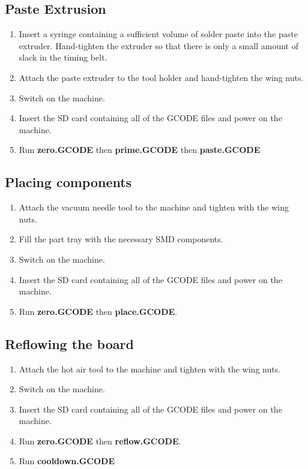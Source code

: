 \documentclass[a4paper,11pt]{article}  %
\begin{document}
\subsection{Paste Extrusion}

\begin{enumerate}

\item
Insert a syringe containing a sufficient volume of solder paste into
the paste extruder. Hand-tighten the extruder so that there is only a 
small amount of slack in the timing belt.

\item
Attach the paste extruder to the tool holder and hand-tighten the wing 
nuts.

\item
Switch on the machine.

\item
Insert the SD card containing all of the GCODE files and power on the 
machine.

\item
Run \textbf{zero.GCODE} then \textbf{prime.GCODE} then \textbf{paste.GCODE}

\end{enumerate}

\subsection{Placing components}
\begin{enumerate}
\item
Attach the vacuum needle tool to the machine and tighten with the wing nuts.

\item
Fill the part tray with the necessary SMD components.

\item
Switch on the machine.

\item
Insert the SD card containing all of the GCODE files and power on the 
machine.

\item
Run \textbf{zero.GCODE} then \textbf{place.GCODE}.
\end{enumerate}

\subsection{Reflowing the board}
\begin{enumerate}
\item
Attach the hot air tool to the machine and tighten with the wing nuts.

\item
Switch on the machine.

\item
Insert the SD card containing all of the GCODE files and power on the 
machine.

\item
Run \textbf{zero.GCODE} then \textbf{reflow.GCODE}.

\item
Run \textbf{cooldown.GCODE}

\end{enumerate}
\end{document}
